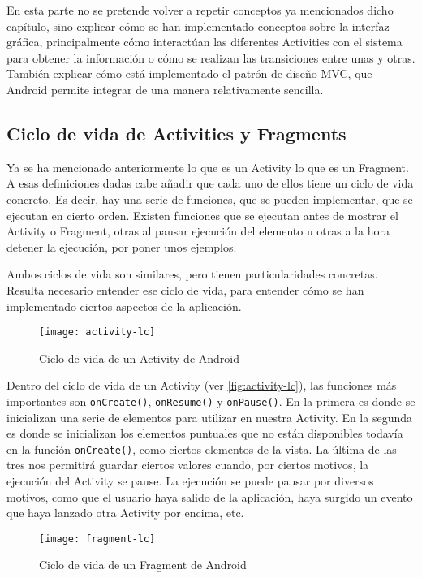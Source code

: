 En esta parte no se pretende volver a repetir conceptos ya mencionados dicho capítulo, sino explicar cómo se han implementado conceptos sobre la interfaz gráfica, principalmente cómo interactúan las diferentes Activities con el sistema para obtener la información o cómo se realizan las transiciones entre unas y otras. También explicar cómo está implementado el patrón de diseño MVC, que Android permite integrar de una manera relativamente sencilla.

\subsection{Ciclo de vida de Activities y Fragments}

Ya se ha mencionado anteriormente lo que es un Activity lo que es un Fragment. A esas definiciones dadas cabe añadir que cada uno de ellos tiene un ciclo de vida concreto. Es decir, hay una serie de funciones, que se pueden implementar, que se ejecutan en cierto orden. Existen funciones que se ejecutan antes de mostrar el Activity o Fragment, otras al pausar ejecución del elemento u otras a la hora detener la ejecución, por poner unos ejemplos.

Ambos ciclos de vida son similares, pero tienen particularidades concretas. Resulta necesario entender ese ciclo de vida, para entender cómo se han implementado ciertos aspectos de la aplicación.

\begin{figure}[H]
	\centering
	\texttt{[image: activity-lc]}
	\caption{Ciclo de vida de un Activity de Android}
	\label{fig:activity-lc}
\end{figure}

Dentro del ciclo de vida de un Activity (ver \autoref{fig:activity-lc}), las funciones más importantes son \texttt{onCreate()}, \texttt{onResume()} y \texttt{onPause()}. En la primera es donde se inicializan una serie de elementos para utilizar en nuestra Activity. En la segunda es donde se inicializan los elementos puntuales que no están disponibles todavía en la función \texttt{onCreate()}, como ciertos elementos de la vista. La última de las tres nos permitirá guardar ciertos valores cuando, por ciertos motivos, la ejecución del Activity se pause. La ejecución se puede pausar por diversos motivos, como que el usuario haya salido de la aplicación, haya surgido un evento que haya lanzado otra Activity por encima, etc.

\begin{figure}[H]
	\centering
	\texttt{[image: fragment-lc]}
	\caption{Ciclo de vida de un Fragment de Android}
	\label{fig:fragment-lc}
\end{figure}

